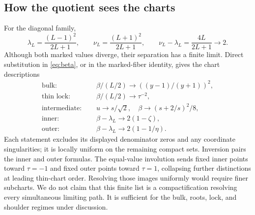 
\subsection{How the quotient sees the charts}
For the diagonal family,
\[
\lambda_L=\frac{(L-1)^2}{2L+1},\qquad
\nu_L=\frac{(L+1)^2}{2L+1},\qquad
\nu_L-\lambda_L=\frac{4L}{2L+1}\longrightarrow2.
\]
Although both marked values diverge, their separation has a finite limit. Direct substitution in \eqref{eq:beta}, or in the marked-fiber identity, gives the chart descriptions
\begin{align*}
\text{bulk: }&\quad \beta/(L/2)\longrightarrow ((y-1)/(y+1))^2,\\
\text{thin lock: }&\quad \beta/(L/2)\longrightarrow\tau^{-2},\\
\text{intermediate: }&\quad u\longrightarrow s/\sqrt2,
\quad\beta\longrightarrow(s+2/s)^2/8,\\
\text{inner: }&\quad \beta-\lambda_L\longrightarrow2(1-\zeta),\\
\text{outer: }&\quad \beta-\lambda_L\longrightarrow2(1-1/\eta).
\end{align*}
Each statement excludes its displayed denominator zeros and any coordinate singularities; it is locally uniform on the remaining compact sets. Inversion pairs the inner and outer formulas. The equal-value involution sends fixed inner points toward \(\tau=-1\) and fixed outer points toward \(\tau=1\), collapsing further distinctions at leading thin-chart order. Resolving those images uniformly would require finer subcharts. We do not claim that this finite list is a compactification resolving every simultaneous limiting path. It is sufficient for the bulk, roots, lock, and shoulder regimes under discussion.
